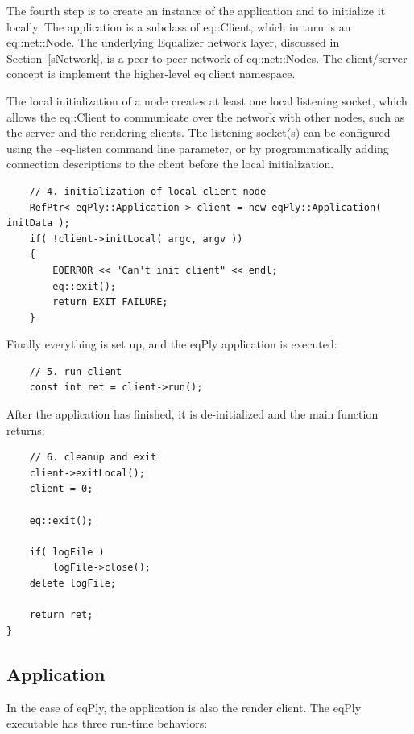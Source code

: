 \documentclass[10pt,a4]{scrartcl}
\newcommand{\sref}[1]{Section~\ref{#1}}
\begin{document}
The fourth step is to create an instance of the application and to
initialize it locally. The application is a subclass of
\textsf{eq::Client}, which in turn is an \textsf{eq::net::Node}. The
underlying Equalizer network layer, discussed in \sref{sNetwork}, is a
peer-to-peer network of \textsf{eq::net::Node}s. The client/server
concept is implement the higher-level \textsf{eq} client namespace.

The local initialization of a node creates at least one local listening
socket, which allows the \textsf{eq::Client} to communicate over the
network with other nodes, such as the server and the rendering
clients. The listening socket(s) can be configured using the
\textsf{--eq-listen} command line parameter, or by programmatically
adding connection descriptions to the client before the local
initialization.

{\footnotesize\begin{lstlisting}
    // 4. initialization of local client node
    RefPtr< eqPly::Application > client = new eqPly::Application( initData );
    if( !client->initLocal( argc, argv ))
    {
        EQERROR << "Can't init client" << endl;
        eq::exit();
        return EXIT_FAILURE;
    }
\end{lstlisting}}%

Finally everything is set up, and the \textsf{eqPly} application is executed:

{\footnotesize\begin{lstlisting}
    // 5. run client
    const int ret = client->run();
\end{lstlisting}}

After the application has finished, it is de-initialized and the
\textsf{main} function returns:

{\footnotesize\begin{lstlisting}
    // 6. cleanup and exit
    client->exitLocal();
    client = 0;

    eq::exit();

    if( logFile )
        logFile->close();
    delete logFile;

    return ret;
}
\end{lstlisting}}


\subsection{Application}

In the case of \textsf{eqPly}, the application is also the render
client. The \textsf{eqPly} executable has three run-time behaviors:
\end{document}
